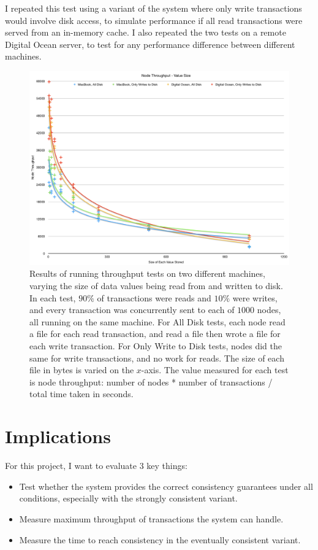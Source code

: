 \documentclass[12pt,a4paper]{article}
\begin{document}
I repeated this test using a variant of the system where only write transactions would involve disk access, to simulate performance if all read transactions were served from an in-memory cache. I also repeated the two tests on a remote Digital Ocean server, to test for any performance difference between different machines.

\begin{figure}
  \centering
    \includegraphics[width=1\textwidth]{figure}
  \caption{Results of running throughput tests on two different machines, varying the size of data values being read from and written to disk. In each test, $90\%$ of transactions were reads and $10\%$ were writes, and every transaction was concurrently sent to each of $1000$ nodes, all running on the same machine. For All Disk tests, each node read a file for each read transaction, and read a file then wrote a file for each write transaction. For Only Write to Disk tests, nodes did the same for write transactions, and no work for reads. The size of each file in bytes is varied on the $x$-axis. The value measured for each test is node throughput: number of nodes * number of transactions / total time taken in seconds.}
\end{figure}

\section*{Implications}

For this project, I want to evaluate 3 key things:

\begin{itemize}
  \item
  Test whether the system provides the correct consistency guarantees under all conditions, especially with the strongly consistent variant.

  \item
  Measure maximum throughput of transactions the system can handle.

  \item
  Measure the time to reach consistency in the eventually consistent variant.

\end{itemize}
\end{document}
